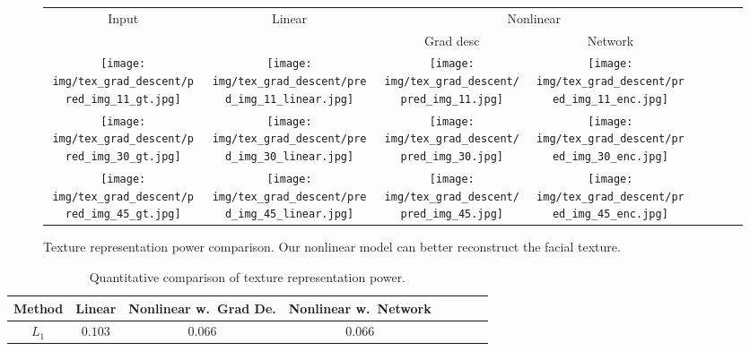 \begin{figure}[t!]
\begin{center}
\small
\setlength{\tabcolsep}{3pt}
\begin{tabular}{ @{}c@{}c@{}c@{}c@{}c@{}c@{}c@{\hskip 1.5mm}c@{}}
\multirow{2}{*}{Input} & \multirow{2}{*}{Linear} & \multicolumn{2}{c}{Nonlinear} \\ & & Grad desc & Network \\
\texttt{[image: img/tex\_grad\_descent/pred\_img\_11\_gt.jpg]} &
\texttt{[image: img/tex\_grad\_descent/pred\_img\_11\_linear.jpg]} &
\texttt{[image: img/tex\_grad\_descent/pred\_img\_11.jpg]} &
\texttt{[image: img/tex\_grad\_descent/pred\_img\_11\_enc.jpg]} &
\\
\texttt{[image: img/tex\_grad\_descent/pred\_img\_30\_gt.jpg]} &
\texttt{[image: img/tex\_grad\_descent/pred\_img\_30\_linear.jpg]} &
\texttt{[image: img/tex\_grad\_descent/pred\_img\_30.jpg]} &
\texttt{[image: img/tex\_grad\_descent/pred\_img\_30\_enc.jpg]} &
\\
\texttt{[image: img/tex\_grad\_descent/pred\_img\_45\_gt.jpg]} &
\texttt{[image: img/tex\_grad\_descent/pred\_img\_45\_linear.jpg]} &
\texttt{[image: img/tex\_grad\_descent/pred\_img\_45.jpg]} &
\texttt{[image: img/tex\_grad\_descent/pred\_img\_45\_enc.jpg]} &
\\
\end{tabular}
\vspace{-2mm}
\caption{\small Texture representation power comparison. Our nonlinear model can better reconstruct the facial texture.}
\label{fig:tex_representationpower}\figvspace
\end{center}
\end{figure}

\begin{table}[t!]
\footnotesize
\caption{\small{Quantitative comparison of texture representation power.}} 
\label{tab:tex_representation_tab}
\vspace{-6mm}
\begin{center}
\begin{tabular}{ cccccccc}
\toprule 
Method & Linear & Nonlinear w.~Grad De. & Nonlinear w.~Network \\ \midrule
$L_1$    & $0.103$ & $0.066$   & $0.066$ \\ 
\bottomrule
\end{tabular}
\end{center}
\figvspace\vspace{-2mm}
\end{table}

